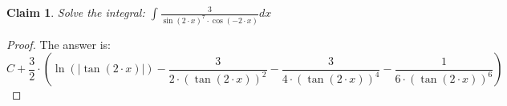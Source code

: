 \documentclass{article}
\newtheorem{theorem}{Claim}
\begin{document}
\begin{theorem}
Solve the integral:
$
\int \frac{ 3 }{ \sin(2 \cdot x)^7 \cdot \cos(-2 \cdot x) }   dx
$
\end{theorem}

\begin{proof}
The answer is:
\[
C+\frac{3}{2}\cdot\left(\ln\left(\left|\tan(2\cdot x)\right|\right)-\frac{3}{2\cdot\left(\tan(2\cdot x)\right)^2}-\frac{3}{4\cdot\left(\tan(2\cdot x)\right)^4}-\frac{1}{6\cdot\left(\tan(2\cdot x)\right)^6}\right)
\]
\end{proof}
\end{document}
